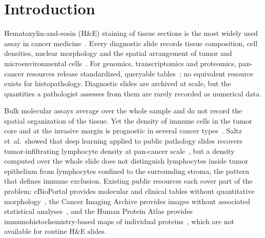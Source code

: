 \section{Introduction}
\label{sec:intro}

Hematoxylin-and-eosin (H\&E) staining of tissue sections is the most widely used
assay in cancer medicine~\cite{bera2019}. Every diagnostic
slide records tissue composition, cell densities, nuclear morphology and the
spatial arrangement of tumor and microenvironmental
cells~\cite{gurcan2009, vanderlaak2021}. For genomics, transcriptomics and
proteomics, pan-cancer resources release standardized, queryable
tables~\cite{kandoth2013, hoadley2014, li2023cptac, corces2018}; no equivalent
resource exists for histopathology. Diagnostic slides are archived at scale, but
the quantities a pathologist assesses from them are rarely recorded as numerical
data.

Bulk molecular assays average over the whole sample and do not record the
spatial organization of the tissue. Yet the density of immune cells in the tumor
core and at the invasive margin is prognostic in several cancer
types~\cite{galon2006, fridman2012immune, pages2018}. Saltz et~al.\ showed that
deep learning applied to public pathology slides recovers tumor-infiltrating
lymphocyte density at pan-cancer scale~\cite{saltz2018til}, but a density
computed over the whole slide does not distinguish lymphocytes inside tumor
epithelium from lymphocytes confined to the surrounding stroma, the pattern that
defines immune exclusion. Existing public resources each cover part of the
problem: cBioPortal provides molecular and clinical tables without quantitative
morphology~\cite{cerami2012cbio}, the Cancer Imaging Archive provides images
without associated statistical analyses~\cite{clark2013tcia}, and the Human
Protein Atlas provides immunohistochemistry-based maps of individual
proteins~\cite{uhlen2015hpa, uhlen2017pathology}, which are not available for
routine H\&E slides.

